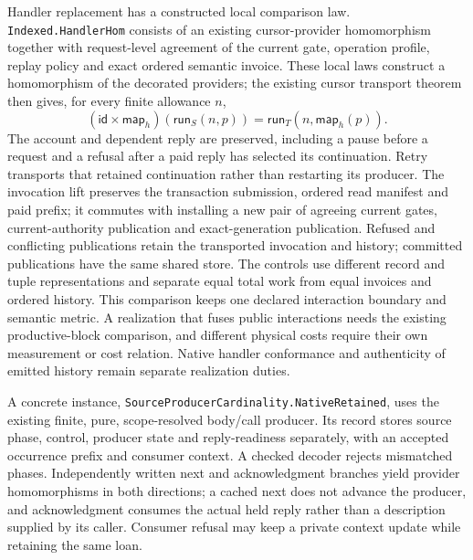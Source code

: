 \documentclass[11pt]{article}
\theoremstyle{definition}
\theoremstyle{remark}
\begin{document}
Handler replacement has a constructed local comparison law.
\nolinkurl{Indexed.HandlerHom} consists of an existing cursor-provider
homomorphism together with request-level agreement of the current gate,
operation profile, replay policy and exact ordered semantic invoice.  These
local laws construct a homomorphism of the decorated providers; the existing
cursor transport theorem then gives, for every finite allowance $n$,
\[
  (\mathsf{id}\times\mathsf{map}_h)(\mathsf{run}_S(n,p))
    =\mathsf{run}_T(n,\mathsf{map}_h(p)).
\]
The account and dependent reply are preserved, including a pause before a
request and a refusal after a paid reply has selected its continuation.
Retry transports that retained continuation rather than restarting its
producer.  The invocation lift preserves the transaction submission, ordered
read manifest and paid prefix; it commutes with installing a new pair of
agreeing current gates, current-authority publication and exact-generation
publication.  Refused and conflicting publications retain the transported
invocation and history; committed publications have the same shared store.
The controls use different record and tuple representations and separate
equal total work from equal invoices and ordered history.  This comparison
keeps one declared interaction boundary and semantic metric.  A realization
that fuses public interactions needs the existing productive-block comparison,
and different physical costs require their own measurement or cost relation.
Native handler conformance and authenticity of emitted history remain separate
realization duties.

A concrete instance, \nolinkurl{SourceProducerCardinality.NativeRetained},
uses the existing finite, pure, scope-resolved body/call producer.  Its record
stores source phase, control, producer state and reply-readiness separately,
with an accepted occurrence prefix and consumer context.  A checked decoder
rejects mismatched phases.  Independently written next and acknowledgment
branches yield provider homomorphisms in both directions; a cached next does
not advance the producer, and acknowledgment consumes the actual held reply
rather than a description supplied by its caller.  Consumer refusal may keep
a private context update while retaining the same loan.
\end{document}
